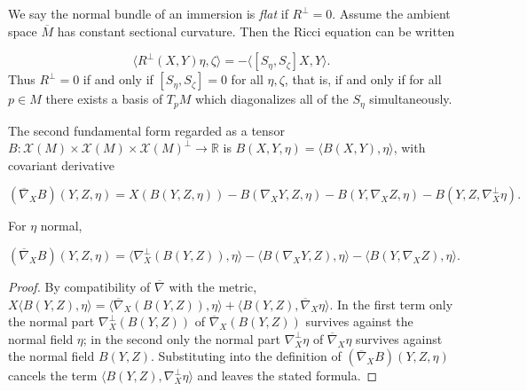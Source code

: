 \begin{remark}
  \label{rem:dc-ch6-3-3}
  \leanok
  We say the normal bundle of an immersion is \emph{flat} if $R^\perp=0$. Assume the
  ambient space $\overline{M}$ has constant sectional curvature. Then the Ricci
  equation can be written
  
  $$
  \langle R^\perp(X,Y)\eta,\zeta\rangle=-\langle[S_\eta,S_\zeta]X,Y\rangle.
  $$
  Thus $R^\perp=0$ if and only if $[S_\eta,S_\zeta]=0$ for all
  $\eta,\zeta$, that is, if and only if for all $p\in M$ there exists a basis of
  $T_pM$ which diagonalizes all of the $S_\eta$ simultaneously.
\end{remark}

\begin{definition}
  \label{def:dc-ch6-3-covderiv-B}
  \leanok
  The second fundamental form regarded as a tensor
  $B:\mathcal{X}(M)\times\mathcal{X}(M)\times\mathcal{X}(M)^\perp\to\mathbb{R}$
  is $B(X,Y,\eta)=\langle B(X,Y),\eta\rangle$, with covariant derivative

  $$
  (\overline{\nabla}_X B)(Y,Z,\eta)=X(B(Y,Z,\eta))-B(\nabla_X Y,Z,\eta)-B(Y,\nabla_X Z,\eta)-B(Y,Z,\nabla_X^\perp\eta).
  $$
\end{definition}

\begin{lemma}
  \label{lem:dc-ch6-3-covderiv-reduce}
  \leanok
  For $\eta$ normal,

  $$
  (\overline{\nabla}_X B)(Y,Z,\eta)=\langle\nabla_X^\perp(B(Y,Z)),\eta\rangle-\langle B(\nabla_X Y,Z),\eta\rangle-\langle B(Y,\nabla_X Z),\eta\rangle.
  $$
\end{lemma}
\begin{proof}
  \leanok
  \sketch
  By compatibility of $\overline{\nabla}$ with the metric,
  $X\langle B(Y,Z),\eta\rangle
  =\langle\overline{\nabla}_X(B(Y,Z)),\eta\rangle
  +\langle B(Y,Z),\overline{\nabla}_X\eta\rangle$. In the first term only the
  normal part $\nabla^\perp_X(B(Y,Z))$ of $\overline{\nabla}_X(B(Y,Z))$
  survives against the normal field $\eta$; in the second only the normal part
  $\nabla^\perp_X\eta$ of $\overline{\nabla}_X\eta$ survives against the normal
  field $B(Y,Z)$. Substituting into the definition of
  $(\overline{\nabla}_X B)(Y,Z,\eta)$ cancels the term
  $\langle B(Y,Z),\nabla^\perp_X\eta\rangle$ and leaves the stated formula.
\end{proof}


